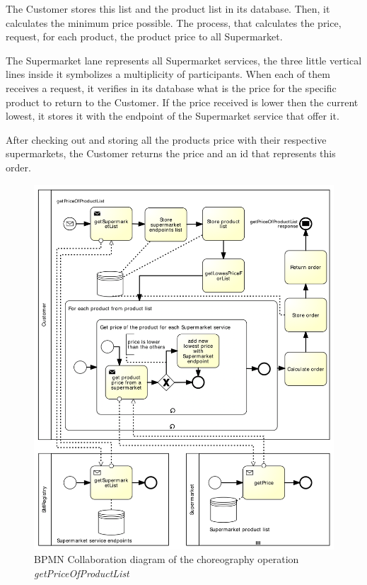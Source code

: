 The Customer stores this list and the product list in its database. Then, it calculates the minimum price possible. The process, that calculates the price, request, for each product,  the product price to all Supermarket.  

The Supermarket lane represents all Supermarket services, the three little vertical lines inside it symbolizes a multiplicity of participants. When each of them receives a request, it verifies in its database what is the price for the specific product to return to the Customer. If the price received is lower then the current lowest, it stores it with the endpoint of the Supermarket service that offer it. 

After checking out and storing all the products price with their respective supermarkets, the Customer returns the price and an id that represents this order.

\begin{figure}[htbp]
\begin{center}
	\includegraphics{images/getPriceOfProductListworkflow} 
\caption{BPMN Collaboration diagram of the choreography operation \emph{getPriceOfProductList}}
\label{getPriceOfProductListworkflow}
\end{center}
\end{figure}

